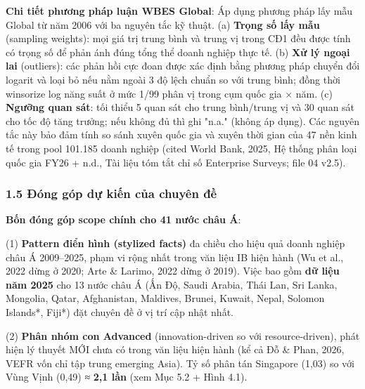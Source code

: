\documentclass[12pt,a4paper]{article}
\begin{document}
\textbf{Chi tiết phương pháp luận WBES Global}: Áp dụng phương pháp lấy
mẫu Global từ năm 2006 với ba nguyên tắc kỹ thuật. (a) \textbf{Trọng số
lấy mẫu} (sampling weights): mọi giá trị trung bình và trung vị trong
CĐ1 đều được tính có trọng số để phản ánh đúng tổng thể doanh nghiệp
thực tế. (b) \textbf{Xử lý ngoại lai} (outliers): các phản hồi cực đoan
được xác định bằng phương pháp chuyển đổi logarit và loại bỏ nếu nằm
ngoài 3 độ lệch chuẩn so với trung bình; đồng thời winsorize log năng
suất ở mức 1/99 phân vị trong cụm quốc gia × năm. (c) \textbf{Ngưỡng
quan sát}: tối thiểu 5 quan sát cho trung bình/trung vị và 30 quan sát
cho tốc độ tăng trưởng; nếu không đủ thì ghi "n.a." (không áp dụng). Các
nguyên tắc này bảo đảm tính so sánh xuyên quốc gia và xuyên thời gian
của 47 nền kinh tế trong pool 101.185 doanh nghiệp (cited World Bank,
2025, Hệ thống phân loại quốc gia FY26 + n.d., Tài liệu tóm tắt chỉ số
Enterprise Surveys; file 04 v2.5).

\hypertarget{15-ux111uxf3ng-guxf3p-dux1ef1-kiux1ebfn-cux1ee7a-chuyuxean-ux111ux1ec1}{%
\subsubsection{1.5 Đóng góp dự kiến của chuyên
đề}\label{15-ux111uxf3ng-guxf3p-dux1ef1-kiux1ebfn-cux1ee7a-chuyuxean-ux111ux1ec1}}

\textbf{Bốn đóng góp scope chính cho 41 nước châu Á}:

(1) \textbf{Pattern điển hình (stylized facts)} đa chiều cho hiệu quả
doanh nghiệp châu Á 2009--2025, phạm vi rộng nhất trong văn liệu IB hiện
hành (Wu et al., 2022 dừng ở 2020; Arte \& Larimo, 2022 dừng ở 2019).
Việc bao gồm \textbf{dữ liệu năm 2025} cho 13 nước châu Á (Ấn Độ, Saudi
Arabia, Thái Lan, Sri Lanka, Mongolia, Qatar, Afghanistan, Maldives,
Brunei, Kuwait, Nepal, Solomon Islands*, Fiji*) đặt chuyên đề ở vị trí
cập nhật nhất.

(2) \textbf{Phân nhóm con Advanced} (innovation-driven so với
resource-driven), phát hiện lý thuyết MỚI chưa có trong văn liệu hiện
hành (kể cả Đỗ \& Phan, 2026, VEFR vốn chỉ tập trung emerging Asia). Tỷ
số phân tán Singapore (1,03) so với Vùng Vịnh (0,49) ≈ \textbf{2,1 lần}
(xem Mục 5.2 + Hình 4.1).
\end{document}
